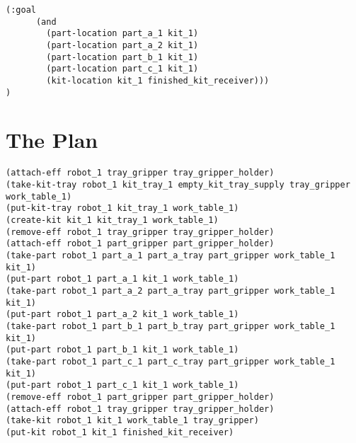 \begin{appendices}
\begin{minipage}{.5\paperwidth}
\begin{mylisting}
\begin{Verbatim}[commandchars=\\\{\},commandchars=+\[\],fontsize=\small,numbersep=3pt]			
	(:goal
	  (and
	    (part-location part_a_1 kit_1)
	    (part-location part_a_2 kit_1)
	    (part-location part_b_1 kit_1)
	    (part-location part_c_1 kit_1)
	    (kit-location kit_1 finished_kit_receiver)))
)
\end{Verbatim}
\end{mylisting}
\end{minipage}

\section{The Plan}\label{appendix:C}
\begin{minipage}{.5\paperwidth}
\begin{mylisting}
\begin{Verbatim}[commandchars=\\\{\},commandchars=+\[\],fontsize=\small,numbersep=3pt]			
(attach-eff robot_1 tray_gripper tray_gripper_holder)
(take-kit-tray robot_1 kit_tray_1 empty_kit_tray_supply tray_gripper work_table_1)
(put-kit-tray robot_1 kit_tray_1 work_table_1)
(create-kit kit_1 kit_tray_1 work_table_1)
(remove-eff robot_1 tray_gripper tray_gripper_holder)
(attach-eff robot_1 part_gripper part_gripper_holder)
(take-part robot_1 part_a_1 part_a_tray part_gripper work_table_1 kit_1)
(put-part robot_1 part_a_1 kit_1 work_table_1)
(take-part robot_1 part_a_2 part_a_tray part_gripper work_table_1 kit_1)
(put-part robot_1 part_a_2 kit_1 work_table_1)
(take-part robot_1 part_b_1 part_b_tray part_gripper work_table_1 kit_1)
(put-part robot_1 part_b_1 kit_1 work_table_1)
(take-part robot_1 part_c_1 part_c_tray part_gripper work_table_1 kit_1)
(put-part robot_1 part_c_1 kit_1 work_table_1)
(remove-eff robot_1 part_gripper part_gripper_holder)
(attach-eff robot_1 tray_gripper tray_gripper_holder)
(take-kit robot_1 kit_1 work_table_1 tray_gripper)
(put-kit robot_1 kit_1 finished_kit_receiver)
\end{Verbatim}
\end{mylisting}
\end{minipage}
\end{appendices} 